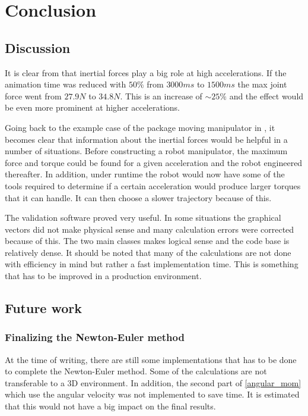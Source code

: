 \chapter{Conclusion}

\section{Discussion}

It is clear from  that inertial forces play a big role at high accelerations. If the animation time was reduced with $50\%$ from $3000ms$ to $1500ms$ the max joint force went from $27.9N$ to $34.8N$. This is an increase of $\sim 25\%$ and the effect would be even more prominent at higher accelerations.

Going back to the example case of the package moving manipulator in , it becomes clear that information about the inertial forces would be helpful in a number of situations. Before constructing a robot manipulator, the maximum force and torque could be found for a given acceleration and the robot engineered thereafter. In addition, under runtime the robot would now have some of the tools required to determine if a certain acceleration would produce larger torques that it can handle. It can then choose a slower trajectory because of this.

The validation software proved very useful. In some situations the graphical vectors did not make physical sense and many calculation errors were corrected because of this. The two main classes makes logical sense and the code base is relatively dense. It should be noted that many of the calculations are not done with efficiency in mind but rather a fast implementation time. This is something that has to be improved in a production environment.

\section{Future work}

\subsection{Finalizing the Newton-Euler method}
At the time of writing, there are still some implementations that has to be done to complete the Newton-Euler method. Some of the calculations are not transferable to a 3D environment. In addition, the second part of \eqref{angular_mom} which use the angular velocity was not implemented to save time. It is estimated that this would not have a big impact on the final results.

